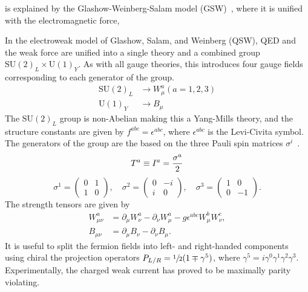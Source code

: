 is explained by the Glashow-Weinberg-Salam model (GSW)~\cite{Glashow1961, Weinberg1967,Salam1964}, where it is unified with the electromagnetic force,

In the electroweak model of Glashow, Salam, and Weinberg (QSW), QED and the weak force are unified into a single theory and a combined group $\text{SU}(2)_L \times \text{U}(1)_Y$.
As with all gauge theories, this introduces four gauge fields corresponding to each generator of the group.
\begin{align}
	\text{SU}(2)_L & \rightarrow W_\mu^a(a = 1, 2, 3) \\
	\text{U}(1)_Y  & \rightarrow B_\mu
\end{align}
The $\text{SU}(2)_L$ group is non-Abelian making this a Yang-Mills theory, and the structure constants are given by $f^{abc} = \epsilon^{abc}$, where $\epsilon^{abc}$ is the Levi-Civita symbol.
The generators of the group are the based on the three Pauli spin matrices $\sigma^i$~\cite{paulispin}.
\begin{equation}
	\label{eq:su2_generators}
	T^a \equiv I^a = \frac{\sigma^a}{2} \\
\end{equation}
\begin{equation}
	\sigma^1 = \begin{pmatrix} 0 & 1 \\ 1 & 0 \end{pmatrix},
	\quad \sigma^2 = \begin{pmatrix} 0 & -i \\ i & 0 \end{pmatrix},
	\quad \sigma^3 = \begin{pmatrix} 1 & 0 \\ 0 & -1 \end{pmatrix}.
	\label{eq:pauli_matrices}
\end{equation}
The strength tensors are given by
\begin{align}
	\label{eq:ew_field_strength_tensors}
	W_{\mu\nu}^a & = \partial_\mu W_\nu^a - \partial_\nu W_\mu^a - g \epsilon^{abc} W_\mu^b W_\nu^c, \\
	B_{\mu\nu}   & = \partial_\mu B_\nu - \partial_\nu B_\mu.
\end{align}
It is useful to split the fermion fields into left- and right-handed components using chiral the projection operators $P_{L/R} = \sfrac{1}{2} (1 \mp \gamma^5)$, where $\gamma^5 = i \gamma^0 \gamma^1 \gamma^2 \gamma^3$.
Experimentally, the charged weak current has proved to be maximally parity violating.
